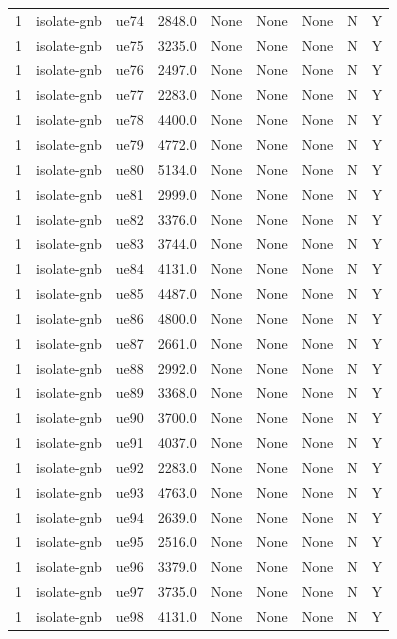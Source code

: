 \begin{table}[ht]
\begin{tabular}{|c|c|c|c|c|c|c|c|c|}
1 & isolate-gnb & ue74 & 2848.0 & None & None & None & N & Y \\
1 & isolate-gnb & ue75 & 3235.0 & None & None & None & N & Y \\
1 & isolate-gnb & ue76 & 2497.0 & None & None & None & N & Y \\
1 & isolate-gnb & ue77 & 2283.0 & None & None & None & N & Y \\
1 & isolate-gnb & ue78 & 4400.0 & None & None & None & N & Y \\
1 & isolate-gnb & ue79 & 4772.0 & None & None & None & N & Y \\
1 & isolate-gnb & ue80 & 5134.0 & None & None & None & N & Y \\
1 & isolate-gnb & ue81 & 2999.0 & None & None & None & N & Y \\
1 & isolate-gnb & ue82 & 3376.0 & None & None & None & N & Y \\
1 & isolate-gnb & ue83 & 3744.0 & None & None & None & N & Y \\
1 & isolate-gnb & ue84 & 4131.0 & None & None & None & N & Y \\
1 & isolate-gnb & ue85 & 4487.0 & None & None & None & N & Y \\
1 & isolate-gnb & ue86 & 4800.0 & None & None & None & N & Y \\
1 & isolate-gnb & ue87 & 2661.0 & None & None & None & N & Y \\
1 & isolate-gnb & ue88 & 2992.0 & None & None & None & N & Y \\
1 & isolate-gnb & ue89 & 3368.0 & None & None & None & N & Y \\
1 & isolate-gnb & ue90 & 3700.0 & None & None & None & N & Y \\
1 & isolate-gnb & ue91 & 4037.0 & None & None & None & N & Y \\
1 & isolate-gnb & ue92 & 2283.0 & None & None & None & N & Y \\
1 & isolate-gnb & ue93 & 4763.0 & None & None & None & N & Y \\
1 & isolate-gnb & ue94 & 2639.0 & None & None & None & N & Y \\
1 & isolate-gnb & ue95 & 2516.0 & None & None & None & N & Y \\
1 & isolate-gnb & ue96 & 3379.0 & None & None & None & N & Y \\
1 & isolate-gnb & ue97 & 3735.0 & None & None & None & N & Y \\
1 & isolate-gnb & ue98 & 4131.0 & None & None & None & N & Y \\

\end{tabular}
\end{table}
